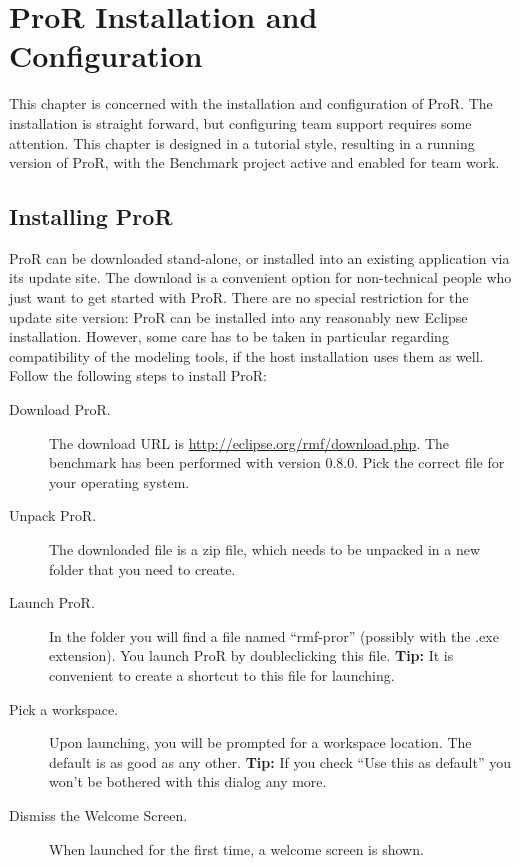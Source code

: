 \documentclass{template/openetcs_report}
\begin{document}
\chapter{ProR Installation and Configuration}

This chapter is concerned with the installation and configuration of ProR.  The installation is straight forward, but configuring team support requires some attention.  This chapter is designed in a tutorial style, resulting in a running version of ProR, with the Benchmark project active and enabled for team work.

\section{Installing ProR}

ProR can be downloaded stand-alone, or installed into an existing application via its update site.  The download is a convenient option for non-technical people who just want to get started with ProR.  There are no special restriction for the update site version: ProR can be installed into any reasonably new Eclipse installation.  However, some care has to be taken in particular regarding compatibility of the modeling tools, if the host installation uses them as well.  Follow the following steps to install ProR:

\begin{description}

\item[Download ProR.]  The download URL is \url{http://eclipse.org/rmf/download.php}.  The benchmark has been performed with version 0.8.0.  Pick the correct file for your operating system.

\item[Unpack ProR.]  The downloaded file is a zip file, which needs to be unpacked in a new folder that you need to create.

\item[Launch ProR.] In the folder you will find a file named ``rmf-pror'' (possibly with the .exe extension).  You launch ProR by doubleclicking this file. \textbf{Tip:} It is convenient to create a shortcut to this file for launching.

\item[Pick a workspace.] Upon launching, you will be prompted for a workspace location.  The default is as good as any other. \textbf{Tip:} If you check ``Use this as default'' you won't be bothered with this dialog any more.

\item[Dismiss the Welcome Screen.] When launched for the first time, a welcome screen is shown.

\end{description}
\end{document}
